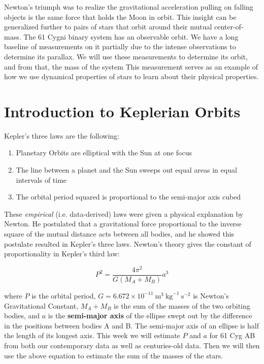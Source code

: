 Newton’s triumph was to realize the gravitational acceleration pulling on falling objects is the same force that holds the Moon in orbit.  This insight can be generalized further to pairs of stars that orbit around their mutual center-of-mass.  The 61 Cygni binary system has an observable orbit. We have a long baseline of measurements on it partially due to the intense observations to determine its parallax.  We will use these measurements to determine its orbit, and from that, the mass of the system  This measurement serves as an example of how we use dynamical properties of stars to learn about their physical properties. 
\section{Introduction to Keplerian Orbits}
 
Kepler's three laws are the following:

\begin{enumerate}
\item Planetary Orbits are elliptical with the Sun at one focus
\item The line between a planet and the Sun sweeps out equal areas in equal intervals of time
\item The orbital period squared is proportional to the semi-major axis cubed
\end{enumerate}

These \textit{empirical} (i.e. data-derived) laws were given a physical explanation by Newton. He postulated that a gravitational force proportional to the inverse square of the mutual distance acts between all bodies, and he showed this postulate resulted in Kepler’s three laws. Newton's theory gives the constant of proportionality in Kepler's third law:

\begin{equation}
P^2 = \frac{4\pi^2}{G(M_A + M_B)}a^3
\end{equation}

where $P$ is the orbital period, $G = 6.672 \times 10^{-11}\: \textrm{m}^3\:\textrm{kg}^{-1}\:\textrm{s}^{-2}$ is Newton's Gravitational Constant, $M_A + M_B$ is the sum of the masses of the two orbiting bodies, and $a$ is the \textbf{semi-major axis} of the ellipse swept out by the difference in the positions between bodies A and B. The semi-major axis of an ellipse is half the length of its longest axis. This week we will estimate $P$ and $a$ for 61 Cyg AB from both our contemporary data as well as centuries-old data. Then we will then use the above equation to estimate the sum of the masses of the stars. 

